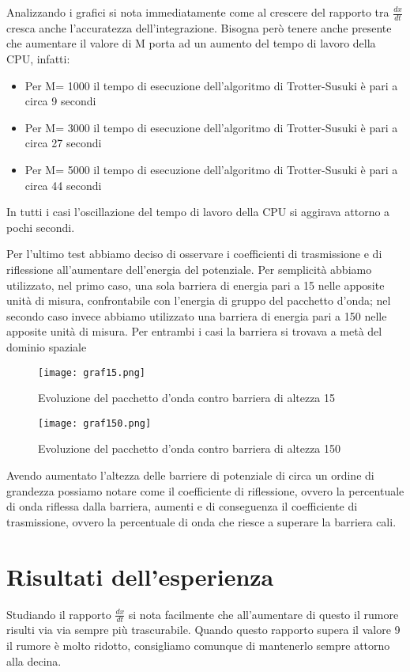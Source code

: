 \documentclass[12pt,onecolumn,a4paper]{memoir}
\begin{document}
Analizzando i grafici si nota immediatamente come al crescere del rapporto tra $\frac{dx}{dt}$ cresca anche l'accuratezza dell'integrazione. 
Bisogna però tenere anche presente che aumentare il valore di M porta ad un aumento del tempo di lavoro della CPU, infatti:

\begin{itemize}
\item Per M= 1000 il tempo di esecuzione dell'algoritmo di Trotter-Susuki è pari a circa 9 secondi
\item Per M= 3000 il tempo di esecuzione dell'algoritmo di Trotter-Susuki è pari a circa 27 secondi
\item Per M= 5000 il tempo di esecuzione dell'algoritmo di Trotter-Susuki è pari a circa 44 secondi
\end{itemize}
In tutti i casi l'oscillazione del tempo di lavoro della CPU si aggirava attorno a pochi secondi.\newline


Per l'ultimo test abbiamo deciso di osservare i coefficienti di trasmissione e di riflessione all'aumentare dell'energia del potenziale. Per semplicità abbiamo utilizzato, nel primo caso, una sola barriera di energia pari a 15 nelle apposite unità di misura, confrontabile con l'energia di gruppo del pacchetto d'onda; nel secondo caso invece abbiamo utilizzato una barriera di energia pari a 150 nelle apposite unità di misura.  \newline
Per entrambi i casi la barriera si trovava a metà del dominio spaziale


 \begin{figure}[htbp] 
\centering 
\texttt{[image: graf15.png]} 
\caption{Evoluzione del pacchetto d'onda contro barriera di altezza 15} 
\end{figure}

 \begin{figure}[htbp] 
\centering 
\texttt{[image: graf150.png]} 
\caption{Evoluzione del pacchetto d'onda contro barriera di altezza 150} 
\end{figure}
\newpage
Avendo aumentato l'altezza delle barriere di potenziale di circa un ordine di grandezza possiamo notare come il coefficiente di riflessione, ovvero la percentuale di onda riflessa dalla barriera, aumenti e di conseguenza il coefficiente di trasmissione, ovvero la percentuale di onda che riesce a superare la barriera cali. 

\section*{Risultati dell'esperienza}
Studiando il rapporto $\frac{dx}{dt}$ si nota facilmente che all'aumentare di questo il rumore risulti via via sempre più trascurabile. Quando questo rapporto supera il valore 9 il rumore è molto ridotto, consigliamo comunque di mantenerlo sempre attorno alla decina. \newline
\end{document}
